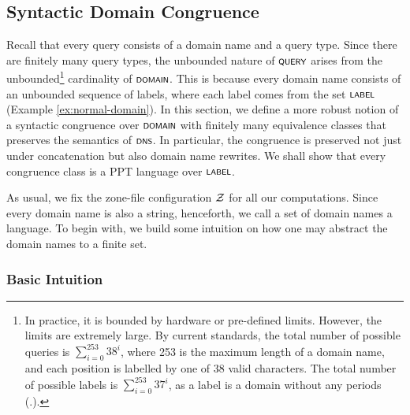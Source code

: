 \subsection{Syntactic Domain Congruence}\label{subsec:syn-domain-congruence}

Recall that every query consists of a domain name and a query type.
Since there are finitely many query types, the unbounded nature of
$\scrsf{query}$ arises from the unbounded\footnote{In practice, it is bounded by hardware or pre-defined limits. However, the limits are extremely large. By current standards, the total number of possible queries is $\sum_{i=0}^{253}38^i$, where 253 is the maximum length of a domain name, and each position is labelled by one of 38 valid characters. The total number of possible labels is $\sum_{i=0}^{253}37^i$, as a label is a domain without any periods (.).} cardinality of $\scrsf{domain}$.
This is because every domain name consists of an unbounded
sequence of labels, where each label comes from the
set $\scrsf{label}$ (Example \ref{ex:normal-domain}). In this section, we define a more robust notion of a syntactic congruence over $\scrsf{domain}$ with finitely many equivalence classes that preserves the semantics of $\scrsf{dns}$. In particular, the congruence is preserved not just under concatenation but also domain name rewrites. We shall show that every congruence class is a PPT language over $\scrsf{label}$.

As usual, we fix the zone-file configuration $\cal Z$ for all our computations. Since every domain name is also a string, henceforth, we call a set of domain names a language. To begin with, we build some intuition on how one may abstract the domain names to a finite set.

\subsubsection{Basic Intuition}

